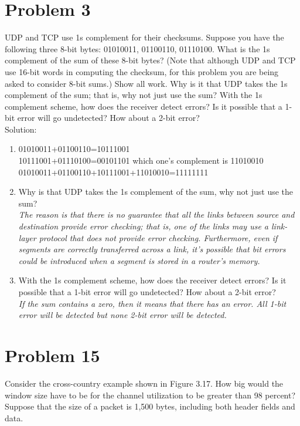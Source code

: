 \documentclass{article}
\begin{document}
\section{Problem 3} UDP and TCP use 1s complement for their checksums. Suppose you have the following three 8-bit bytes: 01010011, 01100110, 01110100. What is the 1s complement of the sum of these 8-bit bytes? (Note that although UDP and TCP use 16-bit words in computing the checksum, for this problem you are being asked to consider 8-bit sums.) Show all work. Why is it that UDP takes the 1s complement of the sum; that is, why not just use the sum? With the 1s complement scheme, how does the receiver detect errors? Is it possible that a 1-bit error will go undetected? How about a 2-bit error?\\



\noindent Solution:\\
\begin{enumerate} 
\item
01010011+01100110=10111001\\
10111001+01110100=00101101 which one's complement is 11010010\\
01010011+01100110+10111001+11010010=11111111\\


\item Why is that UDP takes the 1s complement of the sum, why not just use the sum?\\

\emph{The reason is that there is no guarantee that all the links between source and destination provide error checking; that is, one of the links may use a link-layer protocol that does not provide error checking. Furthermore, even if segments are correctly transferred across a link, it’s possible that bit errors could be introduced when a segment is stored in a router’s memory. }
\item With the 1s complement scheme, how does the receiver detect errors? Is it possible that a 1-bit error will go undetected? How about a 2-bit error?\\

\emph{If the sum contains a zero, then it means that there has an error. All 1-bit error will be detected but none 2-bit error will be detected.}
\end{enumerate}



\newpage
\section{Problem 15} Consider the cross-country example shown in Figure 3.17. How big would the window size have to be for the channel utilization to be greater than 98 percent? Suppose that the size of a packet is 1,500 bytes, including both header fields and data.\\
 
\end{document}
